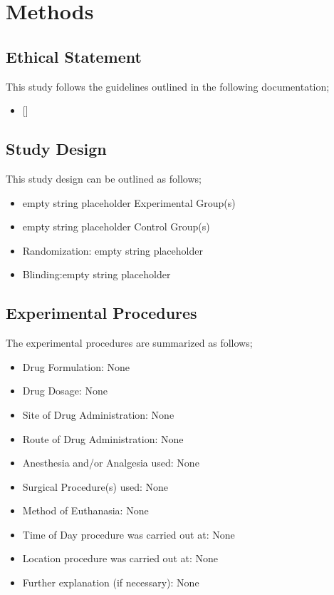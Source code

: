 \documentclass{article}%
\begin{document}
%
\section{Methods}%
\label{sec:Methods}%
\subsection{Ethical Statement}%
\label{subsec:Ethical Statement}%
This study follows the guidelines outlined in the following documentation;%
\begin{itemize}%
\item%
{[}{]}%
\end{itemize}

%
\subsection{Study Design}%
\label{subsec:Study Design}%
This study design can be outlined as follows;%
\begin{itemize}%
\item%
empty string placeholder Experimental Group(s)%
\item%
empty string placeholder Control Group(s)%
\item%
Randomization: empty string placeholder%
\item%
Blinding:empty string placeholder%
\end{itemize}

%
\subsection{Experimental Procedures}%
\label{subsec:Experimental Procedures}%
The experimental procedures are summarized as follows;%
\begin{itemize}%
\item%
Drug Formulation: None%
\item%
Drug Dosage: None%
\item%
Site of Drug Administration: None%
\item%
Route of Drug Administration: None%
\item%
Anesthesia and/or Analgesia used: None%
\item%
Surgical Procedure(s) used: None%
\item%
Method of Euthanasia: None%
\item%
Time of Day procedure was carried out at: None%
\item%
Location procedure was carried out at: None%
\item%
Further explanation (if necessary): None%
\end{itemize}
\end{document}
